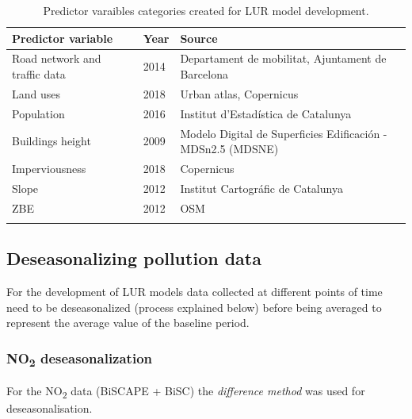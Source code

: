 \documentclass{article}
\begin{document}
\vspace{-2em}

\begin{table}[ht]
\centering
\caption{Predictor varaibles categories created for LUR model development.}
\begin{tabular}{lll}
\toprule
\textbf{Predictor variable} & \textbf{Year} & \textbf{Source} \\
\midrule
Road network and traffic data  & 2014 & Departament de mobilitat, Ajuntament de Barcelona \\
Land uses & 2018 & Urban atlas, Copernicus \\
Population & 2016 & Institut d'Estadística de Catalunya \\
Buildings height & 2009 & Modelo Digital de Superficies Edificación  - MDSn2.5 (MDSNE)\\
Imperviousness & 2018 & Copernicus \\
Slope & 2012 & Institut Cartográfic de Catalunya \\
ZBE & 2012 & OSM\\
\bottomrule
\label{Table S2}
\end{tabular}
\end{table}


\newpage
\subsection{Deseasonalizing pollution data}

For the development of LUR models data collected at different points of time need to be deseasonalized (process explained below) before being averaged to represent the average value of the baseline period. 

\subsubsection{NO\textsubscript{2} deseasonalization}

For the NO\textsubscript{2} data (BiSCAPE + BiSC) the \textit{difference method} was used for deseasonalisation. 
\end{document}
